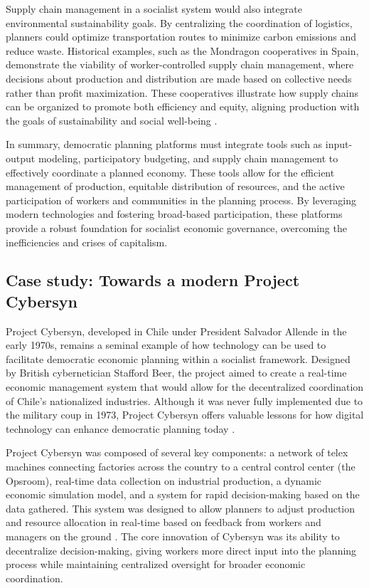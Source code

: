 \begin{refsection}
Supply chain management in a socialist system would also integrate environmental sustainability goals. By centralizing the coordination of logistics, planners could optimize transportation routes to minimize carbon emissions and reduce waste. Historical examples, such as the Mondragon cooperatives in Spain, demonstrate the viability of worker-controlled supply chain management, where decisions about production and distribution are made based on collective needs rather than profit maximization. These cooperatives illustrate how supply chains can be organized to promote both efficiency and equity, aligning production with the goals of sustainability and social well-being \cite[pp.~145]{restakis2012humanizing}.

\medskip

In summary, democratic planning platforms must integrate tools such as input-output modeling, participatory budgeting, and supply chain management to effectively coordinate a planned economy. These tools allow for the efficient management of production, equitable distribution of resources, and the active participation of workers and communities in the planning process. By leveraging modern technologies and fostering broad-based participation, these platforms provide a robust foundation for socialist economic governance, overcoming the inefficiencies and crises of capitalism.

\subsection{Case study: Towards a modern Project Cybersyn}

Project Cybersyn, developed in Chile under President Salvador Allende in the early 1970s, remains a seminal example of how technology can be used to facilitate democratic economic planning within a socialist framework. Designed by British cybernetician Stafford Beer, the project aimed to create a real-time economic management system that would allow for the decentralized coordination of Chile’s nationalized industries. Although it was never fully implemented due to the military coup in 1973, Project Cybersyn offers valuable lessons for how digital technology can enhance democratic planning today \cite[pp.~15]{medina2014cybersyn}.

Project Cybersyn was composed of several key components: a network of telex machines connecting factories across the country to a central control center (the Opsroom), real-time data collection on industrial production, a dynamic economic simulation model, and a system for rapid decision-making based on the data gathered. This system was designed to allow planners to adjust production and resource allocation in real-time based on feedback from workers and managers on the ground \cite[pp.~76]{pickering2010cybernetic}. The core innovation of Cybersyn was its ability to decentralize decision-making, giving workers more direct input into the planning process while maintaining centralized oversight for broader economic coordination.


\end{refsection}
